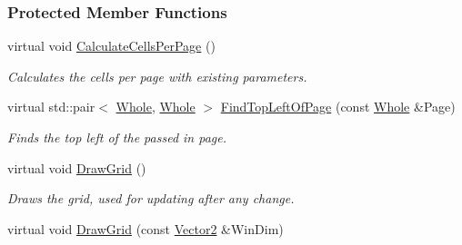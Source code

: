 \subsubsection*{Protected Member Functions}
\begin{DoxyCompactItemize}
\item 
\hypertarget{classphys_1_1UI_1_1PagedCellGrid_a635b2821bf9876a21d91da749ec9db79}{
virtual void \hyperlink{classphys_1_1UI_1_1PagedCellGrid_a635b2821bf9876a21d91da749ec9db79}{CalculateCellsPerPage} ()}
\label{d5/d27/classphys_1_1UI_1_1PagedCellGrid_a635b2821bf9876a21d91da749ec9db79}

\begin{DoxyCompactList}\small\item\em Calculates the cells per page with existing parameters. \item\end{DoxyCompactList}\item 
\hypertarget{classphys_1_1UI_1_1PagedCellGrid_aed3d35d22a9282d7603cd6f5ed0d7f1c}{
virtual std::pair$<$ \hyperlink{namespacephys_a460f6bc24c8dd347b05e0366ae34f34a}{Whole}, \hyperlink{namespacephys_a460f6bc24c8dd347b05e0366ae34f34a}{Whole} $>$ \hyperlink{classphys_1_1UI_1_1PagedCellGrid_aed3d35d22a9282d7603cd6f5ed0d7f1c}{FindTopLeftOfPage} (const \hyperlink{namespacephys_a460f6bc24c8dd347b05e0366ae34f34a}{Whole} \&Page)}
\label{d5/d27/classphys_1_1UI_1_1PagedCellGrid_aed3d35d22a9282d7603cd6f5ed0d7f1c}

\begin{DoxyCompactList}\small\item\em Finds the top left of the passed in page. \item\end{DoxyCompactList}\item 
\hypertarget{classphys_1_1UI_1_1PagedCellGrid_a9eb862a9e31767dd02bf8cf03178392e}{
virtual void \hyperlink{classphys_1_1UI_1_1PagedCellGrid_a9eb862a9e31767dd02bf8cf03178392e}{DrawGrid} ()}
\label{d5/d27/classphys_1_1UI_1_1PagedCellGrid_a9eb862a9e31767dd02bf8cf03178392e}

\begin{DoxyCompactList}\small\item\em Draws the grid, used for updating after any change. \item\end{DoxyCompactList}\item 
\hypertarget{classphys_1_1UI_1_1PagedCellGrid_a85dedc7f0ed0a387b58486350a9c40a7}{
virtual void \hyperlink{classphys_1_1UI_1_1PagedCellGrid_a85dedc7f0ed0a387b58486350a9c40a7}{DrawGrid} (const \hyperlink{classphys_1_1Vector2}{Vector2} \&WinDim)}
\label{d5/d27/classphys_1_1UI_1_1PagedCellGrid_a85dedc7f0ed0a387b58486350a9c40a7}


\end{DoxyCompactItemize}
